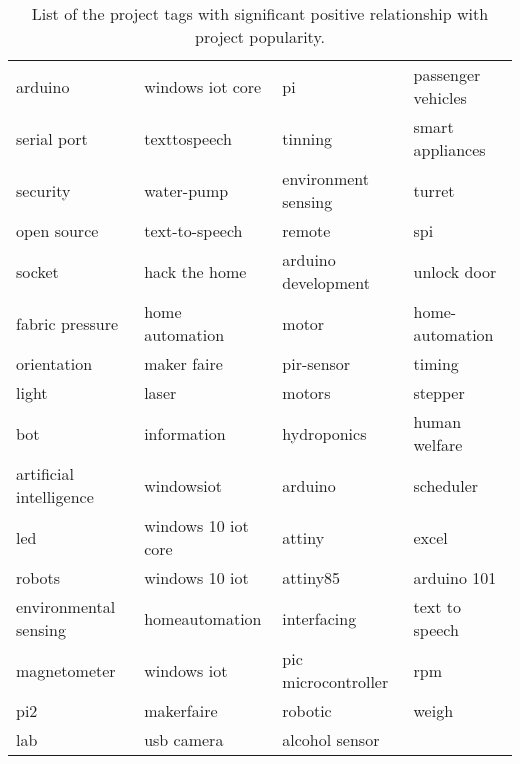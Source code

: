 \begin{table*}[t]
	\centering
	\scriptsize
	\caption{List of the project tags with significant positive relationship with project popularity.}
		\setlength{\tabcolsep}{4pt}
	\label{table:tags}
	\begin{tabularx}{.92\columnwidth}{l:l:l:l}
		\toprule%
		
		arduino                 & windows iot core        & pi              	  & passenger vehicles \\   
		serial port             & texttospeech 		  & tinning         	  & smart appliances \\       
		security                & water-pump      	  & environment sensing   & turret\\              
		open source             & text-to-speech          & remote                & spi\\
	        socket                  & hack the home           & arduino development   & unlock door\\  
		fabric pressure         & home automation         & motor                 & home-automation\\ 
		orientation             & maker faire             & pir-sensor            & timing\\
		light                   & laser                   & motors          	  & stepper\\             
		bot                     & information             & hydroponics           & human welfare\\
		artificial intelligence & windowsiot      	  & arduino               & scheduler\\           
		led                     & windows 10 iot core     & attiny                & excel\\               
		robots                  & windows 10 iot          & attiny85              & arduino 101\\         
		environmental sensing   & homeautomation          & interfacing           & text to speech\\      
		magnetometer 		& windows iot             & pic microcontroller   & rpm\\          
		pi2                     & makerfaire              & robotic      	  & weigh\\
		lab                     & usb camera              & alcohol sensor        &\\ 
		\bottomrule       
	\end{tabularx}
\end{table*}
